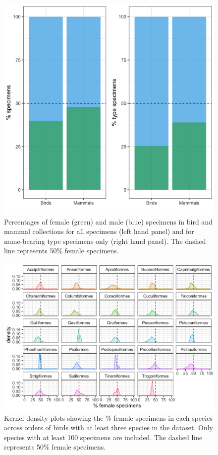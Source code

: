 \documentclass[a4paper, 12pt]{article}
\begin{document}
\begin{figure}[H]
 \centering
  \includegraphics[width = \linewidth]{figures/types-all.png}
  \caption{Percentages of female (green) and male (blue) specimens in bird and mammal collections for all specimens (left hand panel) and for name-bearing type specimens only (right hand panel). 
  The dashed line represents 50\% female specimens.}
  \label{fig-types}
\end{figure}

\begin{figure}
 \centering
  \includegraphics[width = \linewidth]{figures/orders-density-birds-all.png}
  \caption{Kernel density plots showing the \% female specimens in each species across orders of birds with at least three species in the dataset. 
  Only species with at least 100 specimens are included. 
  The dashed line represents 50\% female specimens.}
  \label{fig-bird-orders}
\end{figure}
\end{document}

